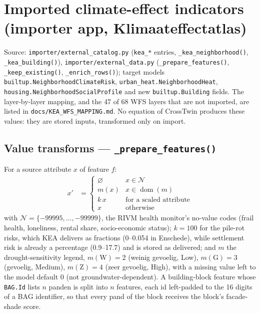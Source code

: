 \documentclass[11pt]{article}
\newcommand{\code}[1]{\texttt{#1}}
\begin{document}
\section{Imported climate-effect indicators (importer app, Klimaateffectatlas)}
\label{sec:kea}

Source: \code{importer/external\_catalog.py} (\code{kea\_*} entries, \code{\_kea\_neighborhood()}, \code{\_kea\_building()}), \code{importer/external\_data.py} (\code{\_prepare\_features()}, \code{\_keep\_existing()}, \code{\_enrich\_rows()}); target models \code{builtup.NeighborhoodClimateRisk}, \code{urban\_heat.NeighborhoodHeat}, \code{housing.NeighborhoodSocialProfile} and new \code{builtup.Building} fields. The layer-by-layer mapping, and the 47 of 68 WFS layers that are not imported, are listed in \code{docs/KEA\_WFS\_MAPPING.md}. No equation of CrossTwin produces these values: they are stored inputs, transformed only on import.

\subsection{Value transforms --- \code{\_prepare\_features()}}
For a source attribute $x$ of feature $f$:
\begin{align}
  x' &= \begin{cases} \varnothing & x \in \mathcal{N} \\ m(x) & x \in \operatorname{dom}(m) \\ k\,x & \text{for a scaled attribute} \\ x & \text{otherwise} \end{cases}
\end{align}
with $\mathcal{N} = \{-99995, \dots, -99999\}$, the RIVM health monitor's no-value codes (frail health, loneliness, rental share, socio-economic status); $k = 100$ for the pile-rot risks, which KEA delivers as fractions (0--0.054 in Enschede), while settlement risk is already a percentage (0.9--17.7) and is stored as delivered; and $m$ the drought-sensitivity legend, $m(\mathrm{W}) = 2$ (weinig gevoelig, Low), $m(\mathrm{G}) = 3$ (gevoelig, Medium), $m(\mathrm{Z}) = 4$ (zeer gevoelig, High), with a missing value left to the model default $0$ (not groundwater-dependent). A building-block feature whose \code{BAG.Id} lists $n$ panden is split into $n$ features, each id left-padded to the 16 digits of a BAG identifier, so that every pand of the block receives the block's facade-shade score.
\end{document}
